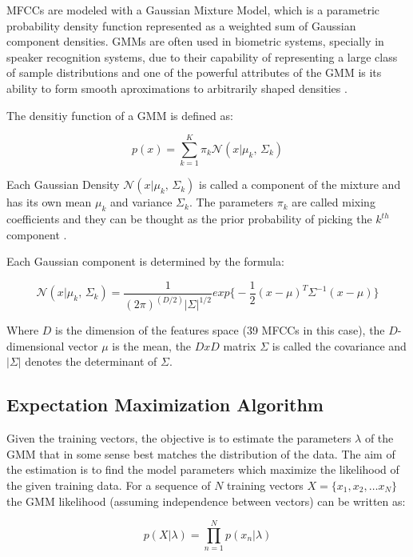 MFCCs are modeled with a Gaussian Mixture Model, which is a parametric probability density
function represented as a weighted sum of Gaussian component densities. GMMs are often
used in biometric systems, specially in speaker recognition systems, due to their
capability of representing a large class of sample distributions and one of the powerful
attributes of the GMM is its ability to form smooth aproximations to arbitrarily shaped
densities \cite{gmm_reynolds}.

The densitiy function of a GMM is defined as:

\begin{equation}
	p(x) = \sum_{k=1}^{K}\pi_{k} \mathcal{N}(x|\mu_{k},\,\Sigma_{k})
\end{equation}

Each Gaussian Density $\mathcal{N}(x|\mu_{k},\,\Sigma_{k})$ is called a component of the mixture
and has its own mean $\mu_{k}$ and variance $\Sigma_{k}$. The parameters $\pi_{k}$ are called
mixing coefficients and they can be thought as the prior probability of picking the $k^{th}$
component \cite{gmm_bishop}.

Each Gaussian component is determined by the formula:

\begin{equation}
	\mathcal{N}(x|\mu_{k},\,\Sigma_{k}) = \frac{1}{(2\pi)^{(D/2)}|\Sigma|^{1/2}} exp \big\{ -\frac{1}{2}(x-\mu)^{T}\Sigma^{-1}(x-\mu)\}
\end{equation}

Where $D$ is the dimension of the features space (39 MFCCs in this case), the $D$-dimensional
vector $\mu$ is the mean, the $DxD$ matrix $\Sigma$ is called the covariance and $|\Sigma|$
denotes the determinant of $\Sigma$.

\subsection{Expectation Maximization Algorithm}

Given the training vectors, the objective is to estimate the parameters $\lambda$ of the GMM
that in some sense best matches the distribution of the data. The aim of the estimation is
to find the model parameters which maximize the likelihood of the given training data. For a
sequence of $N$ training vectors $X=\{x_{1}, x_{2}, \dotsc x_{N}\}$ the GMM likelihood
(assuming independence between vectors) can be written as:

\begin{equation}
	p(X|\lambda) = \prod_{n=1}^{N}p(x_{n}|\lambda)
	\label{eq:likelihoodGMM}
\end{equation}

